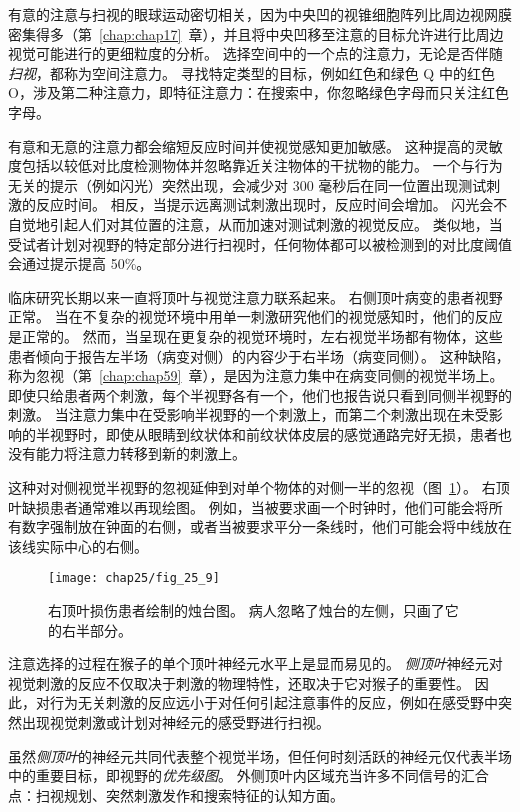 有意的注意与扫视的眼球运动密切相关，因为中央凹的视锥细胞阵列比周边视网膜密集得多（第~\ref{chap:chap17}~章），并且将中央凹移至注意的目标允许进行比周边视觉可能进行的更细粒度的分析。
选择空间中的一个点的注意力，无论是否伴随\textit{扫视}，都称为空间注意力。
寻找特定类型的目标，例如红色和绿色 Q 中的红色 O，涉及第二种注意力，即特征注意力：在搜索中，你忽略绿色字母而只关注红色字母。


有意和无意的注意力都会缩短反应时间并使视觉感知更加敏感。
这种提高的灵敏度包括以较低对比度检测物体并忽略靠近关注物体的干扰物的能力。
一个与行为无关的提示（例如闪光）突然出现，会减少对 300 毫秒后在同一位置出现测试刺激的反应时间。
相反，当提示远离测试刺激出现时，反应时间会增加。
闪光会不自觉地引起人们对其位置的注意，从而加速对测试刺激的视觉反应。
类似地，当受试者计划对视野的特定部分进行扫视时，任何物体都可以被检测到的对比度阈值会通过提示提高 50\%。


临床研究长期以来一直将顶叶与视觉注意力联系起来。
右侧顶叶病变的患者视野正常。
当在不复杂的视觉环境中用单一刺激研究他们的视觉感知时，他们的反应是正常的。
然而，当呈现在更复杂的视觉环境时，左右视觉半场都有物体，这些患者倾向于报告左半场（病变对侧）的内容少于右半场（病变同侧）。
这种缺陷，称为忽视（第~\ref{chap:chap59}~章），是因为注意力集中在病变同侧的视觉半场上。
即使只给患者两个刺激，每个半视野各有一个，他们也报告说只看到同侧半视野的刺激。
当注意力集中在受影响半视野的一个刺激上，而第二个刺激出现在未受影响的半视野时，即使从眼睛到纹状体和前纹状体皮层的感觉通路完好无损，患者也没有能力将注意力转移到新的刺激上。


这种对对侧视觉半视野的忽视延伸到对单个物体的对侧一半的忽视（图~\ref{fig:25_9}）。
右顶叶缺损患者通常难以再现绘图。
例如，当被要求画一个时钟时，他们可能会将所有数字强制放在钟面的右侧，或者当被要求平分一条线时，他们可能会将中线放在该线实际中心的右侧。


\begin{figure}[htbp]
	\centering
	\texttt{[image: chap25/fig\_25\_9]}
	\caption{右顶叶损伤患者绘制的烛台图。
		病人忽略了烛台的左侧，只画了它的右半部分。}
	\label{fig:25_9}
\end{figure}


注意选择的过程在猴子的单个顶叶神经元水平上是显而易见的。
\textit{侧顶叶}神经元对视觉刺激的反应不仅取决于刺激的物理特性，还取决于它对猴子的重要性。
因此，对行为无关刺激的反应远小于对任何引起注意事件的反应，例如在感受野中突然出现视觉刺激或计划对神经元的感受野进行扫视。


虽然\textit{侧顶叶}的神经元共同代表整个视觉半场，但任何时刻活跃的神经元仅代表半场中的重要目标，即视野的\textit{优先级图}。
外侧顶叶内区域充当许多不同信号的汇合点：扫视规划、突然刺激发作和搜索特征的认知方面。


